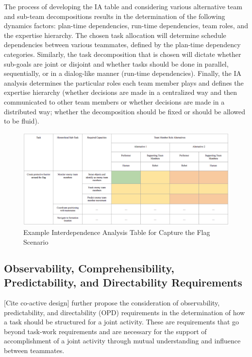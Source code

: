 \documentclass[letterpaper, 10 pt, conference]{ieeeconf}  %
\theoremstyle{definition}
\begin{document}
The process of developing the IA table and considering various alternative team and sub-team decompositions results in the determination of the following dynamics factors: plan-time dependencies, run-time dependencies, team roles, and the expertise hierarchy. The chosen task allocation will determine schedule dependencies between various teammates, defined by the plan-time dependency categories. Similarly, the task decomposition that is chosen will dictate whether sub-goals are joint or disjoint and whether tasks should be done in parallel, sequentially, or in a dialog-like manner (run-time dependencies). Finally, the IA analysis determines the particular roles each team member plays and defines the expertise hierarchy (whether decisions are made in a centralized way and then communicated to other team members or whether decisions are made in a distributed way; whether the decomposition should be fixed or should be allowed to be fluid). 

    \begin{figure}[tb]
    \centering
    \includegraphics[width=\textwidth]{IATable-CtF.png}
   \caption{Example Interdependence Analysis Table for Capture the Flag Scenario}
    \label{fig:iatable_ctf}
    \end{figure}

\subsection{Observability, Comprehensibility, Predictability, and Directability Requirements}
\label{sec:OCPD}
[Cite co-active design] further propose the consideration of observability, predictability, and directability (OPD) requirements in the determination of how a task should be structured for a joint activity. These are requirements that go beyond task-work requirements and are necessary for the support of accomplishment of a joint activity through mutual understanding and influence between teammates. 
\end{document}
